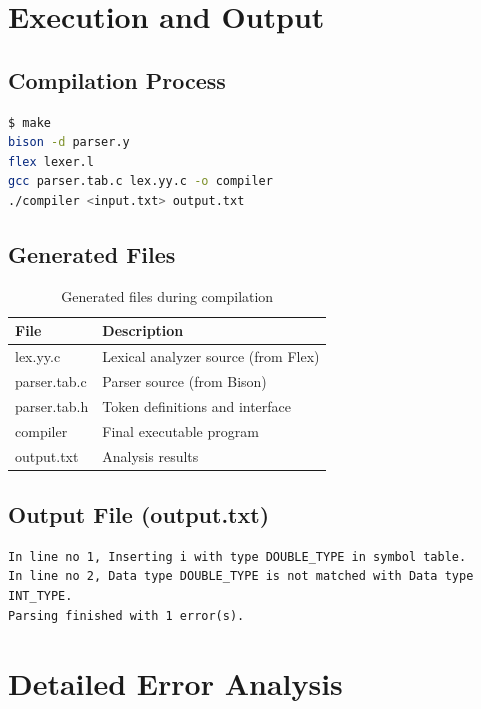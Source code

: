 \documentclass[12pt,a4paper]{article}
\begin{document}
\section{Execution and Output}

\subsection{Compilation Process}

\begin{lstlisting}[language=bash, caption={Build commands}]
$ make
bison -d parser.y
flex lexer.l
gcc parser.tab.c lex.yy.c -o compiler
./compiler <input.txt> output.txt
\end{lstlisting}

\subsection{Generated Files}

\begin{table}[H]
\centering
\begin{tabular}{|l|l|}
\hline
\textbf{File} & \textbf{Description} \\
\hline
lex.yy.c & Lexical analyzer source (from Flex) \\
parser.tab.c & Parser source (from Bison) \\
parser.tab.h & Token definitions and interface \\
compiler & Final executable program \\
output.txt & Analysis results \\
\hline
\end{tabular}
\caption{Generated files during compilation}
\end{table}

\subsection{Output File (output.txt)}

\begin{lstlisting}[caption={Complete compiler output}]
In line no 1, Inserting i with type DOUBLE_TYPE in symbol table.
In line no 2, Data type DOUBLE_TYPE is not matched with Data type INT_TYPE.
Parsing finished with 1 error(s).
\end{lstlisting}

\section{Detailed Error Analysis}
\end{document}
